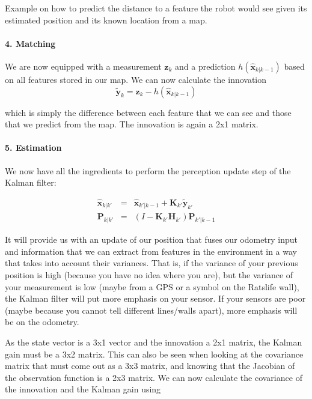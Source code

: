 \begin{framed}
Example on how to predict the distance to a feature the robot would see given its estimated position and its known location from a map.
\end{framed}

\paragraph{4. Matching}
We are now equipped with a measurement $ \boldsymbol{z}_k$ and a prediction $ h(\hat{\boldsymbol{x}}_{k|k-1})$ based on all features stored in our map. We can now calculate the innovation
\begin{equation}
\tilde{\boldsymbol{y}}_{k}=\boldsymbol{z}_{k}-h(\hat{\boldsymbol{x}}_{k|k-1})
\end{equation}

which is simply the difference between each feature that we can see and those that we predict from the map. The innovation is again a 2x1 matrix.

\paragraph{5. Estimation}
We now have all the ingredients to perform the perception update step of the Kalman filter:

\begin{eqnarray}
\hat{\boldsymbol{x}}_{k|k'} &=& \hat{\boldsymbol{x}}_{k'|k-1} + \boldsymbol{K}_{k'}\tilde{\boldsymbol{y}}_{k'}\\
\boldsymbol{P}_{k|k'} &=& (I - \boldsymbol{K}_{k'} {\boldsymbol{H}_{k'}}) \boldsymbol{P}_{k'|k-1}
\end{eqnarray}

It will provide us with an update of our position that fuses our odometry input and information  that we can extract from features in the environment in a way that takes into account their variances. That is, if the variance of your previous position is high (because you have no idea where you are), but the variance of your measurement is low (maybe from a GPS or a symbol on the Ratslife wall), the Kalman filter will put more emphasis on your sensor. If your sensors are poor (maybe because you cannot tell different lines/walls apart), more emphasis will be on the odometry.

As the state vector is a 3x1 vector and the innovation a 2x1 matrix, the Kalman gain must be a 3x2 matrix. This can also be seen when looking at the covariance matrix that must come out as a 3x3 matrix, and knowing that the Jacobian of the observation function is a 2x3 matrix. We can now calculate the covariance of the innovation and the Kalman gain using

